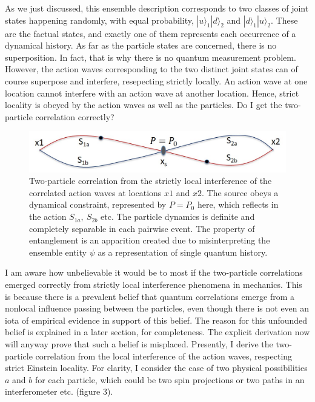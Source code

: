 As we just discussed, this ensemble description corresponds to two classes of joint states
happening randomly, with equal probability, $|u \rangle_1 |d \rangle_2$ and $|d \rangle_1 |u \rangle_2$. These are the factual
states, and exactly one of them represents each occurrence of a dynamical history. As far
as the particle states are concerned, there is no superposition. In fact, that is why there
is no quantum measurement problem. However, the action waves corresponding to the two
distinct joint states can of course superpose and interfere, resepecting strictly locally. An
action wave at one location cannot interfere with an action wave at another location. Hence,
strict locality is obeyed by the action waves as well as the particles. Do I get the two-particle
correlation correctly?
\begin{figure}[H]
\centering
\includegraphics[scale=0.6]{src/images/chap27/3.jpg}
\caption{Two-particle correlation from the strictly local interference of the correlated action waves at
locations $x1$ and $x2$. The source obeys a dynamical constraint, represented by $P = P_0$ here, which
reflects in the action $S_{1a}, ~S_{2b}$ etc. The particle dynamics is definite and completely separable in
each pairwise event. The property of entanglement is an apparition created due to misinterpreting
the ensemble entity $\psi$ as a representation of single quantum history.}\label{ch14-fig3}
\end{figure}

I am aware how unbelievable it would be to most if the two-particle correlations emerged
correctly from strictly local interference phenomena in mechanics. This is because there is a
prevalent belief that quantum correlations emerge from a nonlocal influence passing between
the particles, even though there is not even an iota of empirical evidence in support of this
belief. The reason for this unfounded belief is explained in a later section, for completeness.
The explicit derivation now will anyway prove that such a belief is misplaced. Presently, I
derive the two-particle correlation from the local interference of the action waves, respecting
strict Einstein locality. For clarity, I consider the case of two physical possibilities $a$ and $b$
for each particle, which could be two spin projections or two paths in an interferometer etc.
(figure 3).

